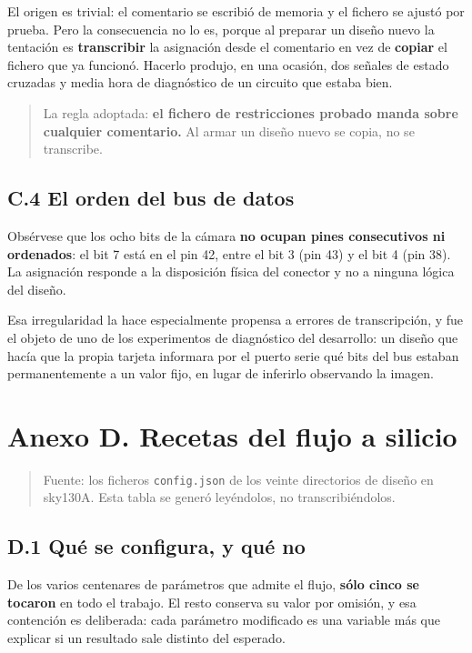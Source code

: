 El origen es trivial: el comentario se escribió de memoria y el fichero
se ajustó por prueba. Pero la consecuencia no lo es, porque al preparar
un diseño nuevo la tentación es \textbf{transcribir} la asignación desde
el comentario en vez de \textbf{copiar} el fichero que ya funcionó.
Hacerlo produjo, en una ocasión, dos señales de estado cruzadas y media
hora de diagnóstico de un circuito que estaba bien.

\begin{quote}
La regla adoptada: \textbf{el fichero de restricciones probado manda
sobre cualquier comentario.} Al armar un diseño nuevo se copia, no se
transcribe.
\end{quote}

\subsection{C.4 El orden del bus de
datos}\label{c.4-el-orden-del-bus-de-datos}

Obsérvese que los ocho bits de la cámara \textbf{no ocupan pines
consecutivos ni ordenados}: el bit 7 está en el pin 42, entre el bit 3
(pin 43) y el bit 4 (pin 38). La asignación responde a la disposición
física del conector y no a ninguna lógica del diseño.

Esa irregularidad la hace especialmente propensa a errores de
transcripción, y fue el objeto de uno de los experimentos de diagnóstico
del desarrollo: un diseño que hacía que la propia tarjeta informara por
el puerto serie qué bits del bus estaban permanentemente a un valor
fijo, en lugar de inferirlo observando la imagen.

\section{Anexo D. Recetas del flujo a
silicio}\label{anexo-d.-recetas-del-flujo-a-silicio}

\begin{quote}
Fuente: los ficheros \texttt{config.json} de los veinte directorios de
diseño en sky130A. Esta tabla se generó leyéndolos, no
transcribiéndolos.
\end{quote}

\subsection{D.1 Qué se configura, y qué
no}\label{d.1-quuxe9-se-configura-y-quuxe9-no}

De los varios centenares de parámetros que admite el flujo, \textbf{sólo
cinco se tocaron} en todo el trabajo. El resto conserva su valor por
omisión, y esa contención es deliberada: cada parámetro modificado es
una variable más que explicar si un resultado sale distinto del
esperado.

